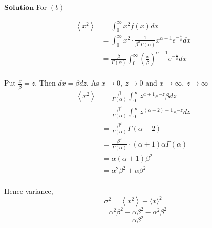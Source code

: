 $\boxed{\textbf{Solution}}$ For $(b)$ 

$$
\begin{aligned}
\left\langle x^{2}\right\rangle&=\int_{0}^{\infty} x^{2} f(x) d x \\
&=\int_{0}^{\infty} x^{2} \cdot \frac{1}{\beta^{a} \Gamma(\alpha)} x^{\alpha-1} e^{-\frac{x}{\beta}} d x \\
&=\frac{\beta}{\Gamma(\alpha)} \int_{0}^{\infty}\left(\frac{x}{\beta}\right)^{\alpha+1} e^{-\frac{x}{\beta}} d x \\
\end{aligned}
$$

Put $\frac{x}{\beta}=z .$ Then $d x=\beta d z .$ As $x \rightarrow 0, \  z \rightarrow 0$ and $x \rightarrow \infty, \  z \rightarrow \infty$
$$
\begin{aligned}
\left\langle x^{2}\right\rangle&=\frac{\beta}{\Gamma(\alpha)} \int_{0}^{\infty} z^{a+1} e^{-z} \beta d z \\
&=\frac{\beta^{2}}{\Gamma(\alpha)} \int_{0}^{\infty} z^{(\alpha+2)-1} e^{-z} d z \\
&=\frac{\beta^{2}}{\Gamma(\alpha)} \Gamma(\alpha+2) \\
&=\frac{\beta^{2}}{\Gamma(\alpha)} \cdot(\alpha+1) \alpha \Gamma(\alpha) \\
&=\alpha(\alpha+1) \beta^{2} \\
&=\alpha^{2} \beta^{2}+\alpha \beta^{2} \\
\end{aligned}
$$

Hence variance, 
$$\sigma^{2}=\left\langle x^{2}\right\rangle-\langle x\rangle^{2}$$
$$=\alpha^{2} \beta^{2}+\alpha \beta^{2}-\alpha^{2} \beta^{2}$$
$$=\alpha \beta^{2}$$
